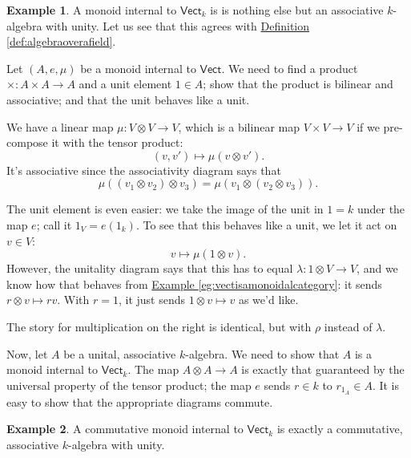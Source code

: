 \documentclass[a4paper]{report}
\theoremstyle{definition}
\newtheorem{example}{Example}[section]
\theoremstyle{plain}
\theoremstyle{remark}
\begin{document}
\begin{example}
  \label{eg:algebrasaremonoidsinternaltovect}
  A monoid internal to $\mathsf{Vect}_{k}$ is is nothing else but an associative $k$-algebra with unity. Let us see that this agrees with \hyperref[def:algebraoverafield]{Definition \ref*{def:algebraoverafield}}.

  Let $(A, e, \mu)$ be a monoid internal to $\mathsf{Vect}$. We need to find a product $\times\colon A \times A \to A$ and a unit element $1 \in A$; show that the product is bilinear and associative; and that the unit behaves like a unit.

  We have a linear map $\mu\colon V \otimes V \to V$, which is a bilinear map $V \times V \to V$ if we pre-compose it with the tensor product:
  \begin{equation*}
    (v, v') \mapsto \mu(v \otimes v').
  \end{equation*}
  It's associative since the associativity diagram says that
  \begin{equation*}
    \mu((v_{1} \otimes v_{2}) \otimes v_{3}) = \mu(v_{1} \otimes (v_{2} \otimes v_{3})).
  \end{equation*}

  The unit element is even easier: we take the image of the unit in $1=k$ under the map $e$; call it $1_{V} = e(1_{k})$. To see that this behaves like a unit, we let it act on $v \in V$:
  \begin{equation*}
    v \mapsto \mu(1 \otimes v).
  \end{equation*}
  However, the unitality diagram says that this has to equal $\lambda\colon 1 \otimes V \to V$, and we know how that behaves from \hyperref[eg:vectisamonoidalcategory]{Example \ref*{eg:vectisamonoidalcategory}}: it sends $r \otimes v \mapsto rv$. With $r = 1$, it just sends $1 \otimes v \mapsto v$ as we'd like. 

  The story for multiplication on the right is identical, but with $\rho$ instead of $\lambda$.

  Now, let $A$ be a unital, associative $k$-algebra. We need to show that $A$ is a monoid internal to $\mathsf{Vect}_{k}$. The map $A \otimes A \to A$ is exactly that guaranteed by the universal property of the tensor product; the map $e$ sends $r \in k$ to $r_{1_{A}} \in A$. It is easy to show that the appropriate diagrams commute.
\end{example}  

\begin{example}
  A commutative monoid internal to $\mathsf{Vect}_{k}$ is exactly a commutative, associative $k$-algebra with unity.
\end{example}
\end{document}
